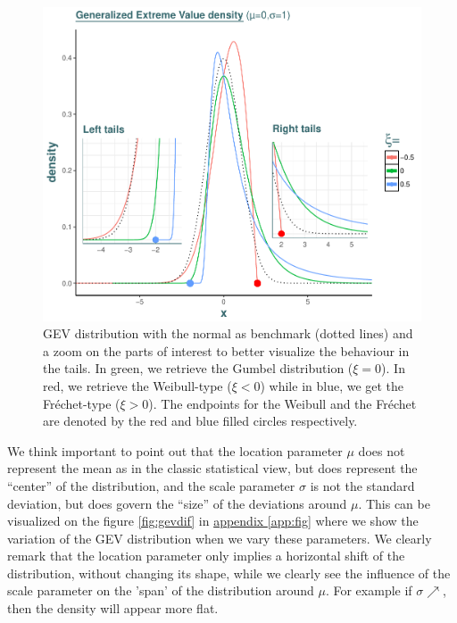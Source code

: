 \documentclass[11pt,a4paper,openany ]{book}
\begin{document}
\begin{figure}[!htb]
	\centering\includegraphics[width=0.8\linewidth]{gev3.pdf}\caption{GEV distribution with the normal as benchmark (dotted lines) and a zoom on the parts of interest to better visualize the behaviour in the tails. In green, we retrieve the Gumbel distribution ($\xi=0$). In red, we retrieve the Weibull-type ($\xi<0$) while in blue, we get the Fréchet-type ($\xi>0$). The endpoints for the Weibull and the Fréchet are denoted by the red and blue filled circles respectively. }\label{gevdens}
\end{figure}

 We think important to point out that the location parameter $\mu$ does not represent
the mean as in the classic statistical view, but does represent the “center” of the distribution, and the scale parameter
$\sigma$ is not the standard deviation, but does govern the “size” of the deviations around $\mu$. This can be visualized on the figure \ref{fig:gevdif} in \hyperref[app:fig]{appendix \ref{app:fig}} where we show the variation of the GEV distribution when we vary these parameters. We clearly remark that the location parameter only implies a horizontal shift of the distribution, without changing its shape, while we clearly see the influence of the scale parameter on the 'span' of the distribution around $\mu$. For example if $\sigma \nearrow$, then the density will appear more flat.  
\end{document}
